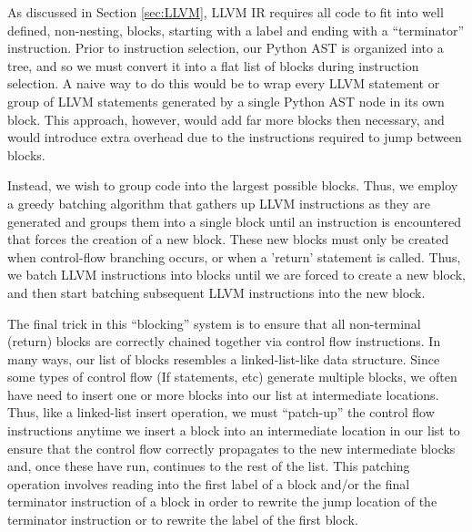 \documentclass[11pt,twocolumn]{article}
\begin{document}



As discussed in Section \ref{sec:LLVM}, LLVM IR requires all code to
fit into well defined, non-nesting, blocks, starting with a label and
ending with a ``terminator'' instruction. Prior to instruction
selection, our Python AST is organized into a tree, and so we must
convert it into a flat list of blocks during instruction selection. A
naive way to do this would be to wrap every LLVM statement or group
of LLVM statements generated by a single Python AST node in its own
block. This approach, however, would add far more blocks then
necessary, and would introduce extra overhead due to the instructions
required to jump between blocks.

Instead, we wish to group code into the largest possible blocks. Thus,
we employ a greedy batching algorithm that gathers up LLVM
instructions as they are generated and groups them into a single block
until an instruction is encountered that forces the creation of a new
block. These new blocks must only be created when control-flow
branching occurs, or when a 'return' statement is called. Thus, we
batch LLVM instructions into blocks until we are forced to create a
new block, and then start batching subsequent LLVM instructions into
the new block.

The final trick in this ``blocking'' system is to ensure that all
non-terminal (return) blocks are correctly chained together via
control flow instructions. In many ways, our list of blocks resembles
a linked-list-like data structure. Since some types of control flow
(If statements, etc) generate multiple blocks, we often have need to
insert one or more blocks into our list at intermediate
locations. Thus, like a linked-list insert operation, we must
``patch-up'' the control flow instructions anytime we insert a block
into an intermediate location in our list to ensure that the control
flow correctly propagates to the new intermediate blocks and, once
these have run, continues to the rest of the list. This patching
operation involves reading into the first label of a block and/or the
final terminator instruction of a block in order to rewrite the jump
location of the terminator instruction or to rewrite the label of the
first block.
\end{document}
